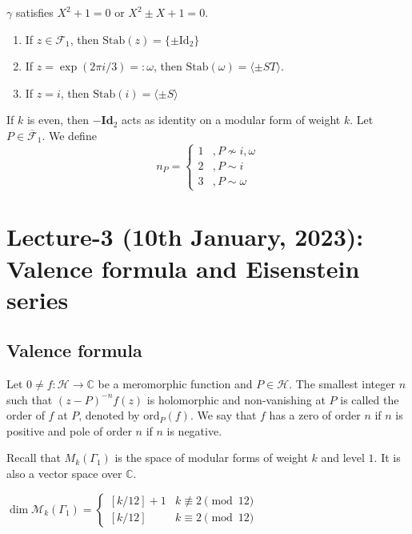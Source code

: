 \documentclass[oneside, 12pt]{scrbook}
\newcommand{\CC}{\mathbb C}
\newcommand{\ord}{\mathrm{ord}}
\newcommand{\Hh}{\mathcal{H}}
\newcommand{\Mm}{\mathcal{M}}
\theoremstyle{theorem}
\begin{document}
\begin{exercise}
$\gamma$ satisfies $X^2 + 1 = 0$ or $X^2 \pm X +1 =0$.
\end{exercise} 

\begin{proposition}
\begin{enumerate}
\item If $z \in \mathcal{F}_{1}$, then $\mathrm{Stab}(z) = \{\pm \mathrm{Id}_{2}\}$
\item If $z = \exp(2 \pi i /3)=: \omega $, then $\mathrm{Stab}(\omega) = \langle \pm ST \rangle $.
\item If $z=i$, then $\mathrm{Stab}(i) = \langle \pm S \rangle $
\end{enumerate}
\end{proposition}

If $k$ is even, then $-\mathbf{Id}_{2}$ acts as identity on a modular form of weight $k$. Let $P \in \overline{\mathcal{F}}_{1}$. We define $$ n_{P}= \begin{cases} 1 & , P \not \sim i, \omega \\ 2 & , P \sim i \\ 3 &, P \sim \omega \end{cases}$$

\chapter{Lecture-3 (10th January, 2023): Valence formula and Eisenstein series}

\section{Valence formula}

\begin{definition}
Let $0 \neq f : \Hh \rightarrow \CC$ be a meromorphic function and $P \in \Hh$. The smallest integer $n$ such that $(z-P)^{-n} f(z)$ is holomorphic and non-vanishing at $P$ is called the order of $f$ at $P$, denoted by $\ord_{P}(f)$. We say that $f$ has a zero of order $n$ if $n$ is positive and pole of order $n$ if $n$ is negative.
\end{definition}


Recall that $M_{k}(\Gamma_{1})$ is the space of modular forms of weight $k$ and level $1$. It is also a vector space over $\CC$. 

\begin{theorem}
$\dim \Mm_{k}(\Gamma_{1}) = \begin{cases}[k/12]+1 & k\not \equiv 2\pmod{12} \\ [k/12] & k \equiv 2\pmod{12} \end{cases}$
\end{theorem}
\end{document}
